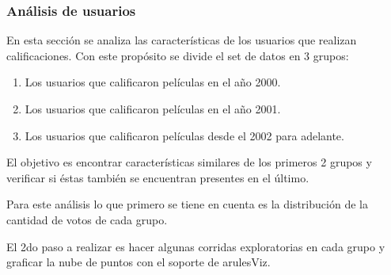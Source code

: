 \documentclass[journal]{IEEEtran}
\begin{document}
\subsubsection{Análisis de usuarios}
En esta sección se analiza las características de los usuarios que realizan
calificaciones. Con este propósito se divide el set de datos en 3 grupos:
\begin{enumerate}
\item Los usuarios que calificaron películas en el año 2000.
\item Los usuarios que calificaron películas en el año 2001.
\item Los usuarios que calificaron películas desde el 2002 para adelante.
\end{enumerate}
El objetivo es encontrar características similares de los primeros 2 grupos
y verificar si éstas también se encuentran presentes en el último.

Para este análisis lo que primero se tiene en cuenta es la distribución
de la cantidad de votos de cada grupo.

El 2do paso a realizar es hacer algunas corridas exploratorias en cada
grupo y graficar la nube de puntos con el soporte de arulesViz. 
\end{document}
